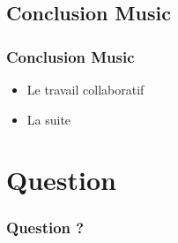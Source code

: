 \documentclass{beamer}
\begin{document}
\subsection{Conclusion Music}
\begin{frame}
  \frametitle{Conclusion Music}
  \begin{itemize}
  \item Le travail collaboratif
  \item La suite
  \end{itemize}
\end{frame}

\section{Question}
\begin{frame}
  \frametitle{Question ?}
\end{frame}
\end{document}
